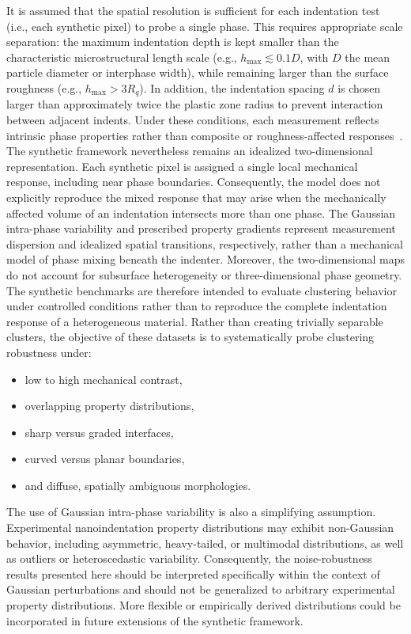 \documentclass[final,3p,times]{elsarticle}
\begin{document}
It is assumed that the spatial resolution is sufficient for each indentation test (i.e., each synthetic pixel) to probe a single phase. This requires appropriate scale separation: the maximum indentation depth is kept smaller than the characteristic microstructural length scale (e.g., $h_\text{max} \lesssim 0.1D$, with $D$ the mean particle diameter or interphase width), while remaining larger than the surface roughness (e.g., $h_\text{max} > 3R_q$). In addition, the indentation spacing $d$ is chosen larger than approximately twice the plastic zone radius to prevent interaction between adjacent indents. Under these conditions, each measurement reflects intrinsic phase properties rather than composite or roughness-affected responses~\cite{randall_nanoindentation_2009}. The synthetic framework nevertheless remains an idealized two-dimensional representation. Each synthetic pixel is assigned a single local mechanical response, including near phase boundaries. Consequently, the model does not explicitly reproduce the mixed response that may arise when the mechanically affected volume of an indentation intersects more than one phase. The Gaussian intra-phase variability and prescribed property gradients represent measurement dispersion and idealized spatial transitions, respectively, rather than a mechanical model of phase mixing beneath the indenter. Moreover, the two-dimensional maps do not account for subsurface heterogeneity or three-dimensional phase geometry. The synthetic benchmarks are therefore intended to evaluate clustering behavior under controlled conditions rather than to reproduce the complete indentation response of a heterogeneous material. Rather than creating trivially separable clusters, the objective of these datasets is to systematically probe clustering robustness under: 
\begin{itemize} \item low to high mechanical contrast, \item overlapping property distributions, \item sharp versus graded interfaces, \item curved versus planar boundaries, \item and diffuse, spatially ambiguous morphologies. 
\end{itemize}

The use of Gaussian intra-phase variability is also a simplifying assumption. Experimental nanoindentation property distributions may exhibit non-Gaussian behavior, including asymmetric, heavy-tailed, or multimodal distributions, as well as outliers or heteroscedastic variability. Consequently, the noise-robustness results presented here should be interpreted specifically within the context of Gaussian perturbations and should not be generalized to arbitrary experimental property distributions. More flexible or empirically derived distributions could be incorporated in future extensions of the synthetic framework.
\end{document}
